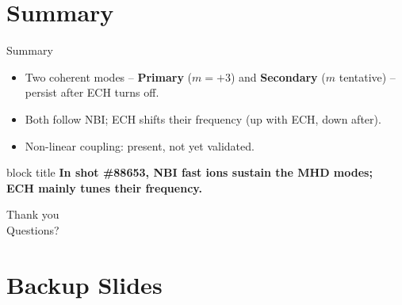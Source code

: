 \documentclass[aspectratio=169,xcolor=table]{beamer}
\newcommand{\Prim}{\textcolor{primcol}{\textbf{Primary}}}
\newcommand{\Sec}{\textcolor{seccol}{\textbf{Secondary}}}
\begin{document}
\section{Summary}

\begin{frame}{Summary}
    \footnotesize
    \begin{itemize}
        \item Two coherent modes -- \Prim{} ($m=+3$) and \Sec{} ($m$ tentative) -- persist after ECH turns off.
        \vspace{0.2cm}
        \item Both follow NBI; ECH shifts their frequency (up with ECH, down after).
        \vspace{0.2cm}
        \item Non-linear coupling: present, not yet validated.
    \end{itemize}
    \vspace{0.6cm}
    \begin{beamercolorbox}[wd=\textwidth,sep=10pt,center,rounded=true,shadow=true]{block title}
        \large\bfseries In shot \#88653, NBI fast ions sustain the MHD modes;\\
        ECH mainly tunes their frequency.
    \end{beamercolorbox}
\end{frame}

\begin{frame}
    \begin{center}
        {\Huge Thank you}\\[0.5cm]
        {\Large Questions?}
    \end{center}
\end{frame}

\appendix
\section{Backup Slides}

\begin{frame}
    \begin{center}
        {}
    \end{center}
\end{frame}
\end{document}
